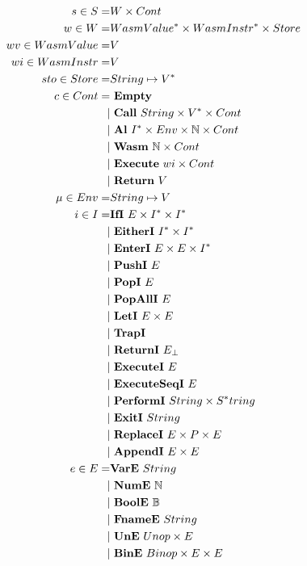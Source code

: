\begin{align*}
%
  \\
  s \in S =& W \times Cont \\
  w \in W =& \seq{WasmValue} \times \seq{WasmInstr} \times Store \\
  wv \in WasmValue =& V \\
  wi \in WasmInstr =& V \\
  sto \in Store =& String \mapsto \seq V \\
  c \in Cont =& ~ \mt \\
    | & ~ \call ~ String \times \seq V \times Cont \\
    | & ~ \al ~ \seq I \times Env \times \mathbb N \times Cont \\
    | & ~ \wasm ~ \mathbb N \times Cont \\
    | & ~ \exe ~ wi \times Cont \\
    | & ~ \ret ~ V \\
  \mu \in Env =& String \mapsto V \\
  i \in I =& \ifi ~ E \times \seq I \times \seq I \\
    | & ~ \eitheri ~ \seq I \times \seq I \\
    | & ~ \enteri ~ E \times E \times \seq I \\
    | & ~ \pushi ~ E \\
    | & ~ \popi ~ E \\
    | & ~ \popalli ~ E \\
    | & ~ \leti ~ E \times E \\
    | & ~ \trapi \\
    | & ~ \returni ~ E_{\bot} \\
    | & ~ \executei ~ E \\
    | & ~ \executeseqi ~ E \\
    | & ~ \performi ~ String \times \seq String \\
    | & ~ \exiti ~ String \\
    | & ~ \replacei ~ E \times P \times E \\
    | & ~ \appendi ~ E \times E \\
%
  e \in E =& \vare ~ String \\
    | & ~ \nume ~ \mathbb N \\
    | & ~ \boole ~ \mathbb B \\
    | & ~ \fnamee ~ String \\
    | & ~ \une ~ Unop \times E \\
    | & ~ \bine ~ Binop \times E \times E \\

\end{align*}
